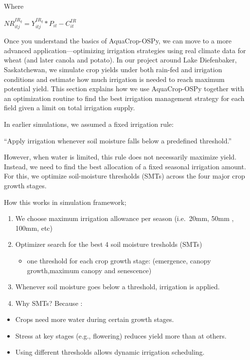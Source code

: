 \documentclass[
  letterpaper,
  DIV=11,
  numbers=noendperiod]{scrartcl}
\providecommand{\tightlist}{%
  \setlength{\itemsep}{0pt}\setlength{\parskip}{0pt}}\usepackage{longtable,booktabs,array}
\begin{document}
\noindent Where

\noindent \(NR^{IR_q}_{itj} = Y^{IR_q}_{itj}*P_{it} - C_{it}^{IR}\)

Once you understand the basics of AquaCrop-OSPy, we can move to a more
advanced application---optimizing irrigation strategies using real
climate data for wheat (and later canola and potato). In our project
around Lake Diefenbaker, Saskatchewan, we simulate crop yields under
both rain-fed and irrigation conditions and estimate how much irrigation
is needed to reach maximum potential yield. This section explains how we
use AquaCrop-OSPy together with an optimization routine to find the best
irrigation management strategy for each field given a limit on total
irrigation supply.

In earlier simulations, we assumed a fixed irrigation rule:

``Apply irrigation whenever soil moisture falls below a predefined
threshold.''

However, when water is limited, this rule does not necessarily maximize
yield. Instead, we need to find the best allocation of a fixed seasonal
irrigation amount. For this, we optimize soil-moisture thresholds (SMTs)
across the four major crop growth stages.

How this works in simulation framework;

\begin{enumerate}
\def\labelenumi{\arabic{enumi}.}
\tightlist
\item
  We choose maximum irrigation allowance per season (i.e.~20mm, 50mm ,
  100mm, etc)
\item
  Optimizer search for the best 4 soil moisture tresholds (SMTs)

  \begin{itemize}
  \tightlist
  \item
    one threshold for each crop growth stage: (emergence, canopy
    growth,maximum canopy and senescence)
  \end{itemize}
\item
  Whenever soil moisture goes below a threshold, irrigation is applied.
\item
  Why SMTs? Because :
\end{enumerate}

\begin{itemize}
\tightlist
\item
  Crops need more water during certain growth stages.
\item
  Stress at key stages (e.g., flowering) reduces yield more than at
  others.
\item
  Using different thresholds allows dynamic irrigation scheduling.
\end{itemize}
\end{document}
